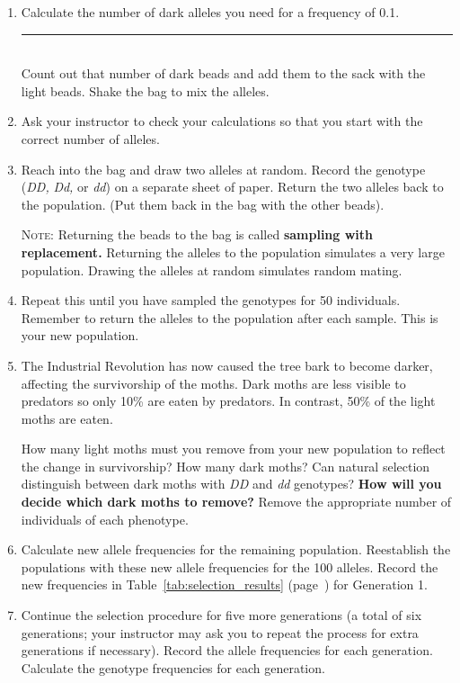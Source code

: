 \documentclass[12pt]{exam}
\newcommand{\allele}[1]{\textit{#1}}
\begin{document}
\begin{questions}
\begin{enumerate}
	\item Calculate the number of dark alleles you need for a frequency of 0.1. \hfill \rule{0.5in}{0.4pt} \\ Count out that number of dark beads and add them to the sack with the light beads. Shake the bag to mix the alleles.
	
	\item Ask your instructor to check your calculations so that you start with the correct number of alleles.
	
	\item Reach into the bag and draw two alleles at random. Record the genotype (\allele{DD,} \allele{Dd,} or \allele{dd}) on a separate sheet of paper. Return the two alleles back to the population. (Put them back in the bag with the other beads).
	
	\textsc{Note:} Returning the beads to the bag is called \textbf{sampling with replacement.} Returning the alleles to the population simulates a very large population. Drawing the alleles at random simulates random mating.
	
	\item Repeat this until you have sampled the genotypes for 50 individuals. Remember to return the alleles to the population after each sample. This is your new population. 
	
	\item The Industrial Revolution has now caused the tree bark to become darker, affecting the survivorship of the moths. Dark moths are less visible to predators so only 10\% are eaten by predators. In contrast, 50\% of the light moths are eaten. 
	
	How many light moths must you remove from your new population to reflect the change in survivorship? How many dark moths? Can natural selection distinguish between dark moths with \allele{DD} and \allele{dd} genotypes? \textbf{How will you decide which dark moths to remove?}  Remove the appropriate number of individuals of each phenotype.
	
	\item Calculate new allele frequencies for the remaining population. Reestablish the populations with these new allele frequencies for the 100 alleles. Record the new frequencies in Table~\ref{tab:selection_results} (page~\pageref{tab:selection_results}) for Generation 1.
	
	\item Continue the selection procedure for five more generations (a total of six generations; your instructor may ask you to repeat the process for extra generations if necessary). Record the allele frequencies for each generation. Calculate the genotype frequencies for each generation. 
	

\end{enumerate}
\end{questions}
\end{document}
